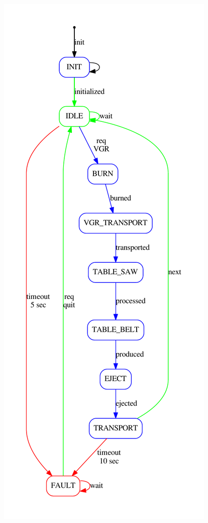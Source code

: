 \begin{DoxyImageNoCaption}
  \mbox{\includegraphics[width=\textwidth,height=\textheight/2,keepaspectratio=true]{dot_TxtMultiProcessingStationRun}}
\end{DoxyImageNoCaption}
 

